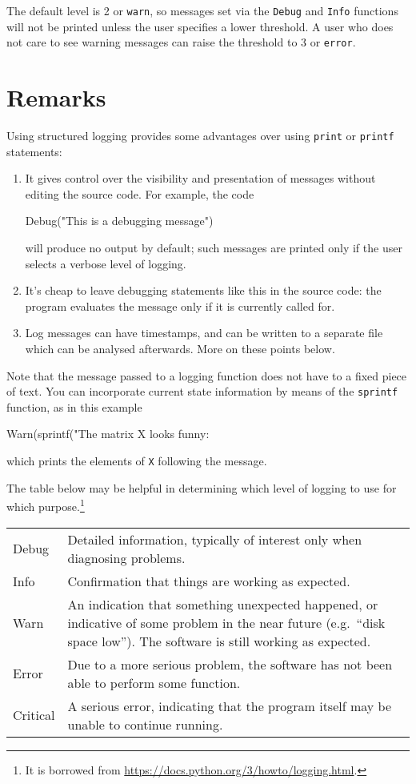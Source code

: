 \documentclass{article}
\begin{document}
The default level is 2 or \texttt{warn}, so messages set via the
\texttt{Debug} and \texttt{Info} functions will not be printed unless
the user specifies a lower threshold. A user who does not care to see
warning messages can raise the threshold to 3 or \texttt{error}.

\section{Remarks}

Using structured logging provides some advantages over using
\texttt{print} or \texttt{printf} statements:
\begin{enumerate}
\item It gives control over the visibility and presentation of
  messages without editing the source code. For example, the code
\begin{code}
  Debug("This is a debugging message")
\end{code}
  will produce no output by default; such messages are printed only
  if the user selects a verbose level of logging.
\item It's cheap to leave debugging statements like this in the source
  code: the program evaluates the message only if it is currently
  called for.
\item Log messages can have timestamps, and can be written to a
  separate file which can be analysed afterwards. More on these
  points below.
\end{enumerate}

Note that the message passed to a logging function does not have to a
fixed piece of text. You can incorporate current state information by
means of the \texttt{sprintf} function, as in this example
\begin{code}
  Warn(sprintf("The matrix X looks funny:\n%
\end{code}
which prints the elements of \texttt{X} following the message.

The table below may be helpful in determining which level of logging
to use for which purpose.\footnote{It is borrowed from
  \url{https://docs.python.org/3/howto/logging.html}.}

\begin{center}
  \begin{tabular}{lp{}}
    Debug & Detailed information, typically of interest only when diagnosing
            problems.\\
    Info & Confirmation that things are working as expected.\\
    Warn & An indication that something unexpected happened, or indicative of some
           problem in the near future (e.g.\ ``disk space low''). The software is still working
           as expected.\\
    Error & Due to a more serious problem, the software has not been able to perform
            some function.\\
    Critical & A serious error, indicating that the program itself may be unable to
               continue running.
  \end{tabular}
\end{center}
\end{document}
